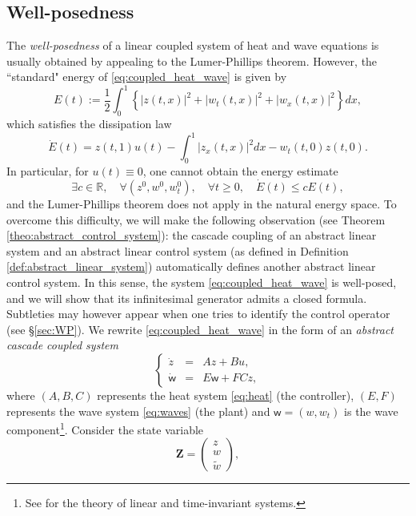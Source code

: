 \documentclass[10pt]{article}
\begin{document}
\subsection{Well-posedness}
The \textit{well-posedness} of a linear coupled system of heat and wave equations is usually obtained by appealing to the Lumer-Phillips theorem. However, the ``standard" energy  of \eqref{eq:coupled_heat_wave} is given by
\[
E(t) := \frac{1}{2} \int_0^1 \left\lbrace |z(t,x)|^2 +|w_t(t,x)|^2 +  |w_x(t,x)|^2 \right\rbrace dx,
\]
which satisfies the dissipation law
\begin{equation}\label{eq:dissipation}
\dot{E}(t) = z(t,1)u(t) - \int_0^1|z_x(t,x)|^2 dx - w_t(t,0)z(t,0).
\end{equation}
In particular, for $u(t) \equiv 0$, one cannot obtain the energy estimate 
\[
\exists c \in \mathbb{R},\quad \forall (z^0,w^0,w_t^0),\quad \forall t \geq 0,\quad 
\dot{E}(t) \leq c E(t),
\]
and the Lumer-Phillips theorem does not apply in the natural energy space. To overcome this difficulty, we  will make the following observation (see Theorem \ref{theo:abstract_control_system}): the cascade coupling of an abstract linear system and an abstract linear control system (as defined in Definition \ref{def:abstract_linear_system}) automatically defines another abstract linear control system. In this sense, the system \eqref{eq:coupled_heat_wave} is well-posed, and we will show that its infinitesimal generator admits a closed formula. Subtleties may however appear when one tries to identify the control operator (see \S \ref{sec:WP}). We rewrite \eqref{eq:coupled_heat_wave} in the form of an \textit{abstract cascade coupled system}
\begin{equation}\label{eq:cascade}
\left\lbrace \begin{array}{rcl}
\dot{z} &=& Az + Bu,\\
\dot{\mathsf{w}} &=& E\mathsf{w} + FCz,
\end{array} \right.
\end{equation}
where $(A,B,C)$ represents the heat system \eqref{eq:heat} (the controller), $(E,F)$ represents the wave system \eqref{eq:waves} (the plant) and $\mathsf{w}=(w,w_t)$ is the wave component\footnote{See \cite{LTI,tucsnak2009observation,Coron} for the theory of linear and time-invariant systems.}. Consider the state variable 
\[
\mathbf{Z} = \left( \begin{array}{c}
z \\
w \\
\tilde w
\end{array} \right),
\]
\end{document}
